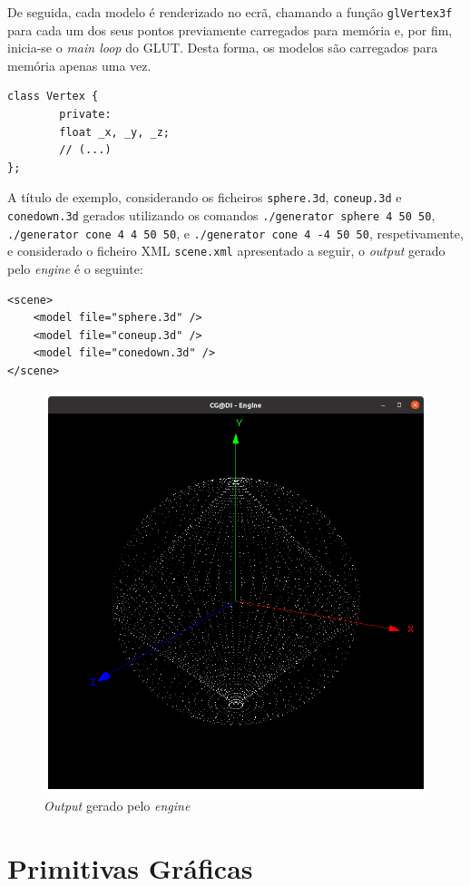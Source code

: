 \documentclass[a4paper, 11pt]{article}
\begin{document}
De seguida, cada modelo é renderizado no ecrã, chamando a função \texttt{glVertex3f} para cada 
um dos seus pontos previamente carregados para memória e, por fim, inicia-se o \textit{main loop}
do GLUT. Desta forma, os modelos são carregados para memória apenas uma vez.

\begin{verbatim}
class Vertex {
        private:
        float _x, _y, _z;
        // (...)
};
\end{verbatim}

A título de exemplo, considerando os ficheiros \texttt{sphere.3d}, \texttt{coneup.3d} e 
\texttt{conedown.3d} gerados utilizando os comandos \texttt{./generator sphere 4 50 50}, 
\texttt{./generator cone 4 4 50 50}, e \texttt{./generator cone 4 -4 50 50},
respetivamente, e considerado o ficheiro XML \texttt{scene.xml} apresentado a seguir, o 
\textit{output} gerado pelo \textit{engine} é o seguinte:

\begin{verbatim}
<scene>
    <model file="sphere.3d" />
    <model file="coneup.3d" />
    <model file="conedown.3d" />
</scene>
\end{verbatim}

\begin{figure}[H]
    \centering
    \includegraphics[width=.6\textwidth]{img/output_exemplo.png}
    \caption{\textit{Output} gerado pelo \textit{engine}}
\end{figure}


\pagebreak

\section{Primitivas Gráficas}
\end{document}
